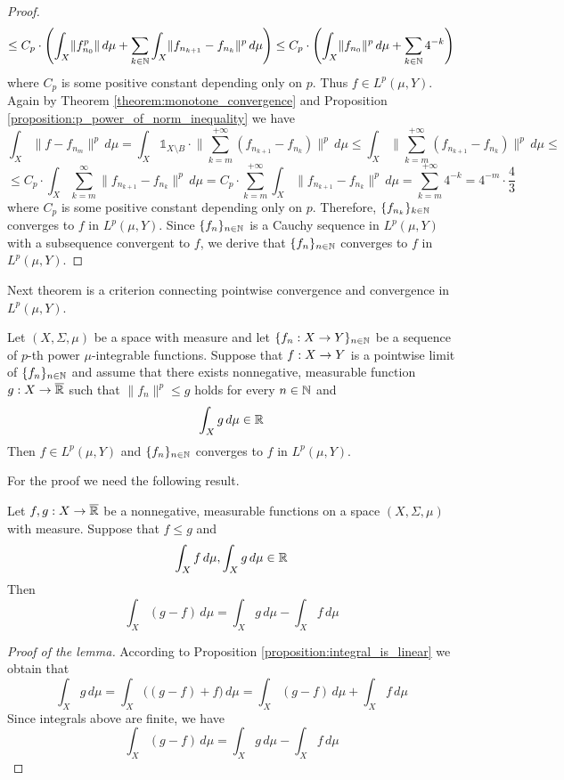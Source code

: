 \begin{proof}
$$\leq C_p\cdot \left(\int_X\lVert f_{n_0}^p\rVert \,d\mu + \sum_{k\in {\mathbb N}}\int_X \lVert f_{n_{k+1}}-f_{n_k}\rVert^p \,d\mu\right) \leq C_p\cdot \left(\int_X\lVert f_{n_0}\rVert^p \,d\mu + \sum_{k\in {\mathbb N}}4^{-k}\right)$$
where $C_p$ is some positive constant depending only on $p$. Thus $f\in L^p(\mu,Y)$. Again by Theorem \ref{theorem:monotone_convergence} and Proposition 
\ref{proposition:p_power_of_norm_inequality} we have
$$\int_X\lVert f - f_{n_m}\rVert^p\,d\mu = \int_X\mathbb{1}_{X\setminus B}\cdot \big\lVert \sum_{k = m}^{+\infty}\left(f_{n_{k+1}} - f_{n_k}\right)\big\rVert^p \,d\mu \leq  \int_X \big\lVert \sum_{k=m}^{+\infty}\left(f_{n_{k+1}} - f_{n_k}\right)\big\rVert^p \,d\mu \leq $$
$$\leq C_p\cdot \int_X\sum_{k=m}^{\infty}\lVert f_{n_{k+1}} - f_{n_k}\rVert^p \,d\mu =C_p\cdot \sum_{k=m}^{+\infty}\int_X\lVert f_{n_{k+1}} - f_{n_k}\rVert^p \,d\mu = \sum_{k=m}^{+\infty}4^{-k} = 4^{-m}\cdot \frac{4}{3} $$
where $C_p$ is some positive constant depending only on $p$. Therefore, $\{f_{n_k}\}_{k\in {\mathbb N}}$ converges to $f$ in $L^p(\mu,Y)$. Since $\{f_n\}_{n\in {\mathbb N}}$ is a Cauchy sequence in $L^p(\mu,Y)$ with a subsequence convergent to $f$, we derive that $\{f_n\}_{n\in {\mathbb N}}$ converges to $f$ in $L^p(\mu,Y)$.
\end{proof}
\noindent
Next theorem is a criterion connecting pointwise convergence and convergence in $L^p(\mu,Y)$.

\begin{theorem}\label{theorem:dominated_convergence}
Let $(X,\Sigma,\mu)$ be a space with measure and let $\{f_n:X\rightarrow Y\}_{n\in {\mathbb N}}$ be a sequence of $p$-th power $\mu$-integrable functions. Suppose that $f:X\rightarrow Y$ is a pointwise limit of $\{f_n\}_{n\in {\mathbb N}}$ and assume that there exists nonnegative, measurable function $g:X\rightarrow \overline{{\mathbb R}}$ such that $\lVert f_n\rVert^p \leq g$ holds for every $n\in {\mathbb N}$ and
$$\int_X g\,d\mu\in {\mathbb R}$$
Then $f\in L^p(\mu,Y)$ and $\{f_n\}_{n\in {\mathbb N}}$ converges to $f$ in $L^p(\mu,Y)$.
\end{theorem}
For the proof we need the following result.

\begin{lemma}\label{lemma:difference_of_integrals}
Let $f, g:X\rightarrow \overline{{\mathbb R}}$ be a nonnegative, measurable functions on a space $(X,\Sigma,\mu)$ with measure. Suppose that $f \leq g$ and
$$\int_Xf\,d\mu, \int_Xg\,d\mu\in {\mathbb R}$$
Then
$$\int_X(g-f)\,d\mu = \int_Xg\,d\mu - \int_Xf\,d\mu$$
\end{lemma}
\begin{proof}[Proof of the lemma]
According to Proposition \ref{proposition:integral_is_linear} we obtain that
$$\int_Xg\,d\mu = \int_X\big((g-f) + f\big)\,d\mu = \int_X(g-f)\,d\mu + \int_Xf\,d\mu$$
Since integrals above are finite, we have
$$\int_X(g-f)\,d\mu = \int_Xg\,d\mu - \int_Xf\,d\mu$$
\end{proof}

